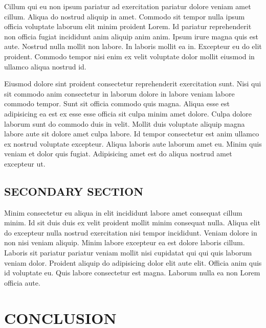 \documentclass[
  12pt,
  a4paper,
  oneside]{tesesusp}
\begin{document}
Cillum qui eu non ipsum pariatur ad exercitation pariatur dolore veniam
amet cillum. Aliqua do nostrud aliquip in amet. Commodo sit tempor nulla
ipsum officia voluptate laborum elit minim proident Lorem. Id pariatur
reprehenderit non officia fugiat incididunt anim aliquip anim anim.
Ipsum irure magna quis est aute. Nostrud nulla mollit non labore. In
laboris mollit ea in. Excepteur eu do elit proident. Commodo tempor nisi
enim ex velit voluptate dolor mollit eiusmod in ullamco aliqua nostrud
id.

Eiusmod dolore sint proident consectetur reprehenderit exercitation
sunt. Nisi qui sit commodo anim consectetur in laborum dolore in labore
veniam labore commodo tempor. Sunt sit officia commodo quis magna.
Aliqua esse est adipisicing ea est ex esse esse officia sit culpa minim
amet dolore. Culpa dolore laborum sunt do commodo duis in velit. Mollit
duis voluptate aliquip magna labore aute sit dolore amet culpa labore.
Id tempor consectetur est anim ullamco ex nostrud voluptate excepteur.
Aliqua laboris aute laborum amet eu. Minim quis veniam et dolor quis
fugiat. Adipisicing amet est do aliqua nostrud amet excepteur ut.

\hypertarget{secondary-section-1}{%
\section{SECONDARY SECTION}\label{secondary-section-1}}

Minim consectetur eu aliqua in elit incididunt labore amet consequat
cillum minim. Id sit duis duis ex velit proident mollit minim consequat
nulla. Aliqua elit do excepteur nulla nostrud exercitation nisi tempor
incididunt. Veniam dolore in non nisi veniam aliquip. Minim labore
excepteur ea est dolore laboris cillum. Laboris sit pariatur pariatur
veniam mollit nisi cupidatat qui qui quis laborum veniam dolor. Proident
aliquip do adipisicing dolor elit aute elit. Officia anim quis id
voluptate eu. Quis labore consectetur est magna. Laborum nulla ea non
Lorem officia aute.


\hypertarget{conclusion}{%
\chapter{CONCLUSION}\label{conclusion}}
\end{document}

